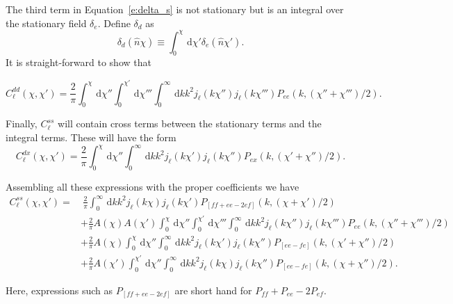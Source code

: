\documentclass[twocolumn,prl,floatfix]{revtex4-1}
\newcommand{\ud}{\,\mathrm{d}}
\begin{document}
The third term in Equation~\ref{e:delta_s} is not stationary but is an integral
over the stationary field $\delta_e$.
Define $\delta_d$ as
\begin{equation}
    \delta_d(\hat n \chi) \equiv \int_0^\chi \ud \chi' \delta_e(\hat n \chi').
\end{equation}
It is straight-forward to show that
\begin{widetext}
\begin{equation}
C^{dd}_\ell(\chi,\chi')
    =
    \frac{2}{\pi}
    \int_0^\chi\ud\chi''
    \int_0^{\chi'}\ud\chi'''
    \int_0^\infty\ud k k^2 j_\ell(k\chi'') j_{\ell}(k\chi''')
    P_{ee}(k, (\chi''+\chi''')/2).
\end{equation}

Finally, $C^{ss}_\ell$ will contain cross terms between the stationary terms
and the integral terms.  These will have the form
\begin{equation}
C^{dx}_\ell(\chi,\chi')
    =
    \frac{2}{\pi}
    \int_0^\chi\ud\chi''
    \int_0^\infty\ud k k^2 
    j_\ell(k\chi') j_{\ell}(k\chi'')P_{ex}(k, (\chi' + \chi'')/2).
\end{equation}

Assembling all these expressions with the proper coefficients we have
\begin{align}
    \label{e:Clss}
C^{ss}_\ell(\chi,\chi') = &~
    \frac{2}{\pi}
    \int_0^\infty\ud k k^2
    j_\ell(k\chi) j_{\ell}(k\chi')
    P_{[ff + ee - 2ef]}(k, (\chi + \chi')/2)
    \nonumber\\
    & +
    \frac{2}{\pi}
    A(\chi) A(\chi')
    \int_0^\chi\ud\chi''
    \int_0^{\chi'}\ud\chi'''
    \int_0^\infty\ud k k^2 j_\ell(k\chi'') j_{\ell}(k\chi''')
    P_{ee}(k, (\chi''+\chi''')/2)
    \nonumber\\
    & +
    \frac{2}{\pi}
    A(\chi)
    \int_0^\chi\ud\chi''
    \int_0^\infty\ud k k^2 
    j_\ell(k\chi') j_{\ell}(k\chi'')
    P_{[ee - fe]}(k, (\chi' + \chi'')/2)
    \nonumber\\
    & +
    \frac{2}{\pi}
    A(\chi')
    \int_0^{\chi'}\ud\chi''
    \int_0^\infty\ud k k^2 
    j_\ell(k\chi) j_{\ell}(k\chi'')
    P_{[ee - fe]}(k, (\chi + \chi'')/2).
\end{align}
\end{widetext}
Here, expressions such as $P_{[ff + ee - 2ef]}$ are short hand for $P_{ff} +
P_{ee} - 2P_{ef}$.
\end{document}
